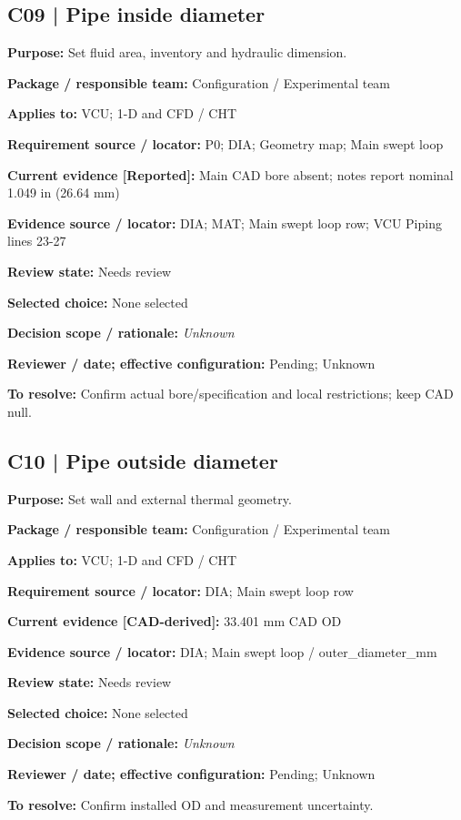 \documentclass[11pt]{article}
\begin{document}
\par\noindent\begin{minipage}{\textwidth}\small\setlength{\parskip}{2pt}
\subsection*{C09 | Pipe inside diameter}
\textbf{Purpose:} Set fluid area, inventory and hydraulic dimension.\par
\textbf{Package / responsible team:} Configuration / Experimental team\par
\textbf{Applies to:} VCU; 1-D and CFD / CHT\par
\textbf{Requirement source / locator:} P0; DIA; Geometry map; Main swept loop\par
\textbf{Current evidence [Reported]:} Main CAD bore absent; notes report nominal 1.049 in (26.64 mm)\par
\textbf{Evidence source / locator:} DIA; MAT; Main swept loop row; VCU Piping lines 23-27\par
\textbf{Review state:} Needs review\par
\textbf{Selected choice:} None selected\par
\textbf{Decision scope / rationale:} \textit{Unknown}\par
\textbf{Reviewer / date; effective configuration:} Pending; Unknown\par
\textbf{To resolve:} Confirm actual bore/specification and local restrictions; keep CAD null.\par
\end{minipage}\par\vspace{5pt}
\par\noindent\begin{minipage}{\textwidth}\small\setlength{\parskip}{2pt}
\subsection*{C10 | Pipe outside diameter}
\textbf{Purpose:} Set wall and external thermal geometry.\par
\textbf{Package / responsible team:} Configuration / Experimental team\par
\textbf{Applies to:} VCU; 1-D and CFD / CHT\par
\textbf{Requirement source / locator:} DIA; Main swept loop row\par
\textbf{Current evidence [CAD-derived]:} 33.401 mm CAD OD\par
\textbf{Evidence source / locator:} DIA; Main swept loop / outer\_\allowbreak{}diameter\_\allowbreak{}mm\par
\textbf{Review state:} Needs review\par
\textbf{Selected choice:} None selected\par
\textbf{Decision scope / rationale:} \textit{Unknown}\par
\textbf{Reviewer / date; effective configuration:} Pending; Unknown\par
\textbf{To resolve:} Confirm installed OD and measurement uncertainty.\par
\end{minipage}\par\vspace{5pt}
\end{document}
